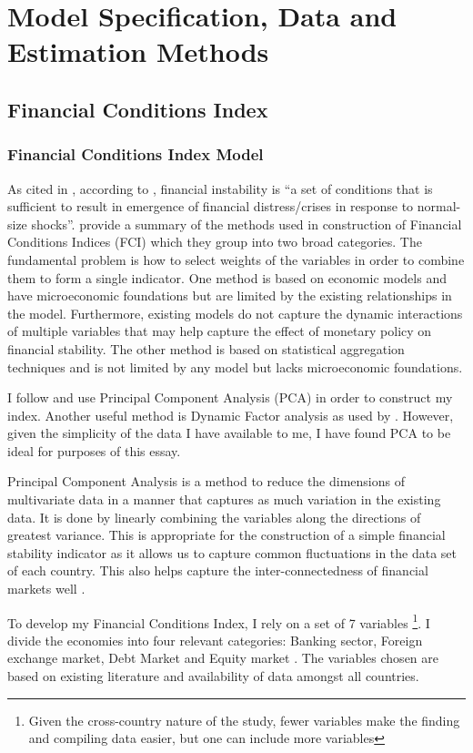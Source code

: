 \documentclass[12pt]{article}
\begin{document}
\section{Model Specification, Data and Estimation Methods}

\subsection{Financial Conditions Index}
\subsubsection{Financial Conditions Index Model}

As cited in \cite{RN4}, according to \cite{borio2009}, financial instability is ``a set of conditions that is sufficient to result in emergence of financial distress/crises in response to normal-size shocks''. \cite{RN35} provide a summary of the methods used in construction of Financial Conditions Indices (FCI) which they group into two broad categories. The fundamental problem is how to select weights of the variables in order to combine them to form a single indicator. One method is based on economic models and have microeconomic foundations but are limited by the existing relationships in the model.  Furthermore, existing models do not capture the dynamic interactions of multiple variables that may help capture the effect of monetary policy on financial stability.  The other method is based on statistical aggregation techniques and is not limited by any model but lacks microeconomic foundations. 

I follow \cite{RN4} and use Principal Component Analysis (PCA) in order to construct my index. Another useful method is Dynamic Factor analysis as used by \cite{RN35}. However, given the simplicity of the data I have available to me, I have found PCA to be ideal for purposes of this essay.

Principal Component Analysis is a method to reduce the dimensions of multivariate data in a manner that captures as much variation in the existing data.  It is done by linearly combining the variables along the directions of greatest variance. This is appropriate for the construction of a simple financial stability indicator as it allows us to capture common fluctuations in the data set of each country.  This also helps capture the inter-connectedness of financial markets well \citep{RN17}. 

To develop my Financial Conditions Index, I rely on a set of 7 variables \footnote{Given the cross-country nature of the study, fewer variables make the finding and compiling data easier, but one can include more variables}.  I divide the economies into four relevant categories: Banking sector, Foreign exchange market, Debt Market and Equity market \citep{RN20}.  The variables chosen are based on existing literature and availability of data amongst all countries.
\end{document}
